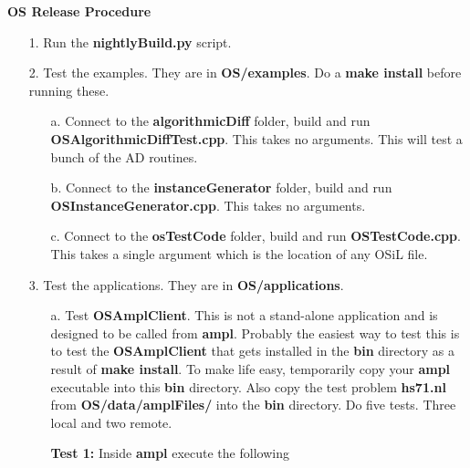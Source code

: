 \documentclass[11pt]{article}
\begin{document}
\begin{center}
{\Large
{\bf OS Release Procedure }
}%
\end{center}

\begin{itemize}

\item[1.] Run the {\bf nightlyBuild.py} script.

\item[2.] Test the examples.  They are in {\bf OS/examples}.  Do a {\bf make install} before running these.

\begin{itemize}

\item[a.]  Connect to the {\bf algorithmicDiff} folder, build and run {\bf OSAlgorithmicDiffTest.cpp}.  This takes no arguments.  This will test a bunch of the AD routines.



\item[b.]  Connect to the {\bf instanceGenerator} folder, build and run {\bf OSInstanceGenerator.cpp}.  This takes no arguments.

\item[c.]  Connect to the {\bf osTestCode} folder, build and run {\bf OSTestCode.cpp}.  This takes a single argument which is the location of any OSiL file.


\end{itemize}

\item[3.] Test the applications.  They are in {\bf OS/applications}.

\begin{itemize}
 
 
 \item[a.]  Test {\bf OSAmplClient}.  This is not a stand-alone application and is designed to be called from  {\bf ampl}.   Probably the easiest way to test this is to test the {\bf OSAmplClient}  that gets installed in the {\bf bin} directory as a result of {\bf make install}. To make life easy, temporarily copy your {\bf ampl} executable into this {\bf bin} directory.   Also copy the test problem {\bf hs71.nl}  from {\bf OS/data/amplFiles/} into the {\bf bin} directory.   Do five tests. Three local and two remote.
 
 
 \vskip 10pt
 
 
 {\bf Test 1:}  Inside  {\bf ampl} execute the following
 



\end{itemize}
\end{itemize}
\end{document}
